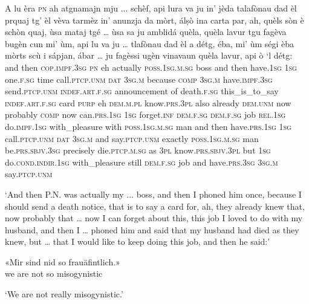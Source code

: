 \begin{linenumbers}
\gll  A lu èra \textsc{pn} ah atgnamajn mju ... schèf, api lura va ju in’ jèda talafònau dad èl prquaj tg' èl vèva tarmèz in’ anunzja da mòrt, álṣò ina carta par, ah, quèls sòn è schòn quaj, ùsa mataj tgé … ùsa sa ju amblidá quèla, quèla lavur tgu fagèva bugèn cun mi' ùm, api lu va ju … tlafònau dad èl a détg, éba, mi' ùm ségi èba mòrts scù i sápjan, ábar … ju fagèssi ugèn vinavaun quèla lavur, api ò `l détg:  \\
and then \textsc{cop.impf.3sg} \textsc{pn} eh actually \textsc{poss.1sg.m.sg} {} boss and then have.\textsc{1sg}  \textsc{1sg} one.\textsc{f.sg} time call.\textsc{ptcp.unm} \textsc{dat} \textsc{3sg.m} because \textsc{comp} \textsc{3sg.m} have.\textsc{impf.3sg} send.\textsc{ptcp.unm} \textsc{indef.art.f.sg} announcement of death.\textsc{f.sg} this\_is\_to\_say \textsc{indef.art.f.sg} card \textsc{purp} eh \textsc{dem.m.pl} know.\textsc{prs.3pl} also already \textsc{dem.unm} now probably \textsc{comp} {} now can.\textsc{prs.1sg} \textsc{1sg} forget.\textsc{inf} \textsc{dem.f.sg} \textsc{dem.f.sg} job \textsc{rel.1sg} do.\textsc{impf.1sg} with\_pleasure\footnotemark{} with \textsc{poss.1sg.m.sg} man and then have.\textsc{prs.1sg} \textsc{1sg} {} call.\textsc{ptcp.unm} \textsc{dat} \textsc{3sg.m} and say.\textsc{ptcp.unm} exactly \textsc{poss.1sg.m.sg} man be.\textsc{prs.sbjv.3sg} precisely die.\textsc{ptcp.m.sg} as \textsc{3pl} know.\textsc{prs.sbjv.3pl} but \textsc{1sg} {} do.\textsc{cond.indir.1sg} with\_pleasure still \textsc{dem.f.sg} job and have.\textsc{prs.3sg} \textsc{3sg.m} say.\textsc{ptcp.unm}\\ 
\end{linenumbers}
\medskip
\glt `And then P.N. was actually my ... boss, and then I phoned him once, because I should send a death notice, that is to say a card for, ah, they already knew that, now probably that … now I can forget about this, this job I loved to do with my husband, and then I … phoned him and said that my husband had died as they knew, but … that I would like to keep doing this job, and then he said:'
\medskip

\begin{linenumbers}
\gll  «Mir sind nid so frauäfintlich.»\footnotemark   \\
we are not so misogynistic  \\
\end{linenumbers}
\medskip
\glt `We are not really misogynistic.'
\medskip

